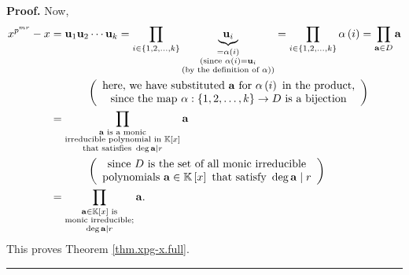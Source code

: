 \documentclass[numbers=enddot,12pt,final,onecolumn,notitlepage]{scrartcl}%
\theoremstyle{definition}
\newenvironment{proof}[1][Proof]{\noindent\textbf{#1.} }{\ \rule{0.5em}{0.5em}}
\let\prodnonlimits\prod
\renewcommand{\prod}{\prodnonlimits\limits}
\begin{document}
\begin{proof}
Now,%
\begin{align*}
x^{p^{mr}}-x  &  =\mathbf{u}_{1}\mathbf{u}_{2}\cdots\mathbf{u}_{k}=\prod
_{i\in\left\{  1,2,\ldots,k\right\}  }\underbrace{\mathbf{u}_{i}%
}_{\substack{=\alpha\left(  i\right)  \\\text{(since }\alpha\left(  i\right)
=\mathbf{u}_{i}\\\text{(by the definition of }\alpha\text{))}}}=\prod
_{i\in\left\{  1,2,\ldots,k\right\}  }\alpha\left(  i\right)  =\prod
_{\mathbf{a}\in D}\mathbf{a}\\
&  \ \ \ \ \ \ \ \ \ \ \left(
\begin{array}
[c]{c}%
\text{here, we have substituted }\mathbf{a}\text{ for }\alpha\left(  i\right)
\text{ in the product,}\\
\text{since the map }\alpha:\left\{  1,2,\ldots,k\right\}  \rightarrow D\text{
is a bijection}%
\end{array}
\right) \\
&  =\prod_{\substack{\mathbf{a}\text{ is a monic}\\\text{irreducible
polynomial in }\mathbb{K}\left[  x\right]  \\\text{that satisfies }%
\deg\mathbf{a}\mid r}}\mathbf{a}\\
&  \ \ \ \ \ \ \ \ \ \ \left(
\begin{array}
[c]{c}%
\text{since }D\text{ is the set of all monic irreducible}\\
\text{polynomials }\mathbf{a}\in\mathbb{K}\left[  x\right]  \text{ that
satisfy }\deg\mathbf{a}\mid r
\end{array}
\right) \\
&  =\prod_{\substack{\mathbf{a}\in\mathbb{K}\left[  x\right]  \text{
is}\\\text{monic irreducible;}\\\deg\mathbf{a}\mid r}}\mathbf{a.}%
\end{align*}
This proves Theorem \ref{thm.xpg-x.full}.
\end{proof}
\end{document}
